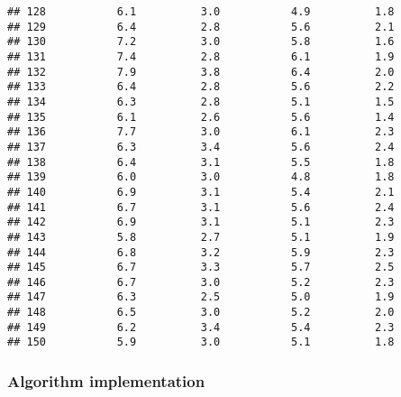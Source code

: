 \documentclass[
]{article}
\begin{document}
\begin{verbatim}
## 128           6.1          3.0           4.9          1.8
## 129           6.4          2.8           5.6          2.1
## 130           7.2          3.0           5.8          1.6
## 131           7.4          2.8           6.1          1.9
## 132           7.9          3.8           6.4          2.0
## 133           6.4          2.8           5.6          2.2
## 134           6.3          2.8           5.1          1.5
## 135           6.1          2.6           5.6          1.4
## 136           7.7          3.0           6.1          2.3
## 137           6.3          3.4           5.6          2.4
## 138           6.4          3.1           5.5          1.8
## 139           6.0          3.0           4.8          1.8
## 140           6.9          3.1           5.4          2.1
## 141           6.7          3.1           5.6          2.4
## 142           6.9          3.1           5.1          2.3
## 143           5.8          2.7           5.1          1.9
## 144           6.8          3.2           5.9          2.3
## 145           6.7          3.3           5.7          2.5
## 146           6.7          3.0           5.2          2.3
## 147           6.3          2.5           5.0          1.9
## 148           6.5          3.0           5.2          2.0
## 149           6.2          3.4           5.4          2.3
## 150           5.9          3.0           5.1          1.8
\end{verbatim}

\subsubsection{Algorithm implementation}\label{algorithm-implementation}
\end{document}
